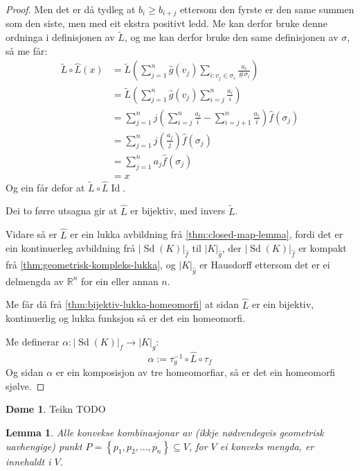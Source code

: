 \documentclass[a4paper, 12pt, norsk]{article}
\theoremstyle{plain}
\newtheorem{lemma}[theorem]{Lemma}
\theoremstyle{definition}
\newtheorem{example}[theorem]{Døme}
\newcommand{\Rb}{\mathbb{R}}
\newcommand{\gr}[1]{ \lvert #1 \rvert } %
\newcommand{\set}[1]{ \left \{ #1 \right \} } %
\newcommand{\tuple}[1]{ \left( #1 \right) } %
\DeclareMathOperator{\Sd}{Sd}
\DeclareMathOperator{\Id}{Id}
\begin{document}
\begin{proof}
	Men det er då tydleg at \( b_i \geq b_{i+j} \) ettersom den fyrste er den same summen som den siste, men med eit ekstra positivt ledd. Me kan derfor bruke denne ordninga i definisjonen av \( \tilde{L} \), og me kan derfor bruke den same definisjonen av \( \sigma \), så me får:
	\begin{align*}
		\tilde{L}\circ\hat{L}(x) &= \tilde{L}\tuple{\sum_{j=1}^n \hat{g}(v_j) \sum_{i:v_j\in\sigma_i}\frac{a_i}{\#\sigma_i}} \\
		&= \tilde{L}\tuple{\sum_{j=1}^n \hat{g}(v_j) \sum_{i=j}^n \frac{a_i}{i}} \\
		&= \sum_{j=1}^n j\tuple{\sum_{i=j}^n \frac{a_i}{i} - \sum_{i=j+1}^n \frac{a_i}{i}}\hat{f}(\sigma_j) \\
		&= \sum_{j=1}^n j\tuple{\frac{a_j}{j}}\hat{f}(\sigma_j) \\
		&= \sum_{j=1}^n a_j \hat{f}(\sigma_j) \\
		&= x
	\end{align*}
	Og ein får defor at \( \tilde{L}\circ\hat{L} \Id \). 
	
	Dei to førre utsagna gir at \( \hat{L} \) er bijektiv, med invers \( \tilde{L} \).

	Vidare så er \( \hat{L} \) er ein lukka avbildning frå \autoref{thm:closed-map-lemma}, fordi det er ein kontinuerleg avbildning frå \( \gr{\Sd(K)}_{\hat{f}} \) til \( \gr{K}_{\hat{g}} \), der \( \gr{\Sd(K)}_{\hat{f}} \) er kompakt frå \autoref{thm:geometrisk-kompleks-lukka}, og  \( \gr{K}_{\hat{g}} \) er Hausdorff ettersom det er ei delmengda av \( \Rb^n \) for ein eller annan \( n \).

	Me får då frå \autoref{thm:bijektiv-lukka-homeomorfi} at sidan \( \hat{L} \) er ein bijektiv, kontinuerlig og lukka funksjon så er det ein homeomorfi.

	Me definerar \( \alpha: \gr{\Sd(K)}_f \to \gr{K}_g \):
	\[
		\alpha := \tau_g^{-1} \circ \hat{L} \circ \tau_f
	\]
	Og sidan \( \alpha \) er ein komposisjon av tre homeomorfiar, så er det ein homeomorfi sjølve.
\end{proof}

\begin{example}
	Teikn TODO
\end{example}

\begin{lemma} \label{thm:konveks-kombinasjon-i-konveks}
	Alle konvekse kombinasjonar av (ikkje nødvendegvis geometrisk uavhengige) punkt \( P = \set{p_1, p_2, \dots, p_n } \subseteq V \), for \( V \) ei konveks mengda, er innehaldt i \( V \).
\end{lemma}
\end{document}
